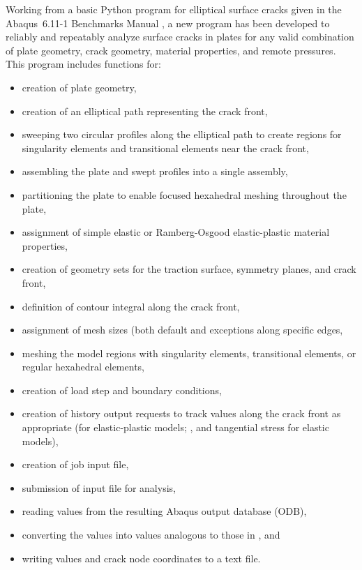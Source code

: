 Working from a basic Python program for elliptical surface cracks given in the Abaqus~6.11-1 Benchmarks Manual \citeyearpar{abaqus-611-benchmarks-manual}, a new program has been developed to reliably and repeatably analyze surface cracks in plates for any valid combination of plate geometry, crack geometry, material properties, and remote pressures.
This program includes functions for:
\begin{itemize}
\item creation of plate geometry,
\item creation of an elliptical path representing the crack front,
\item sweeping two circular profiles along the elliptical path to create regions for singularity elements and transitional elements near the crack front,
\item assembling the plate and swept profiles into a single assembly,
\item partitioning the plate to enable focused hexahedral meshing throughout the plate,
\item assignment of simple elastic or Ramberg-Osgood elastic-plastic material properties,
\item creation of geometry sets for the traction surface, symmetry planes, and crack front,
\item definition of contour integral \J along the crack front,
\item assignment of mesh sizes (both default and exceptions along specific edges,
\item meshing the model regions with singularity elements, transitional elements, or regular hexahedral elements,
\item creation of load step and boundary conditions,
\item creation of history output requests to track values along the crack front as appropriate (\J for elastic-plastic models; \J, \K and tangential stress for elastic models),
\item creation of job input file,
\item submission of input file for analysis,
\item reading \J values from the resulting Abaqus output database (ODB),
\item converting the \J values into \hone values analogous to those in , and
\item writing \hone values and crack node coordinates to a text file.
\end{itemize}

